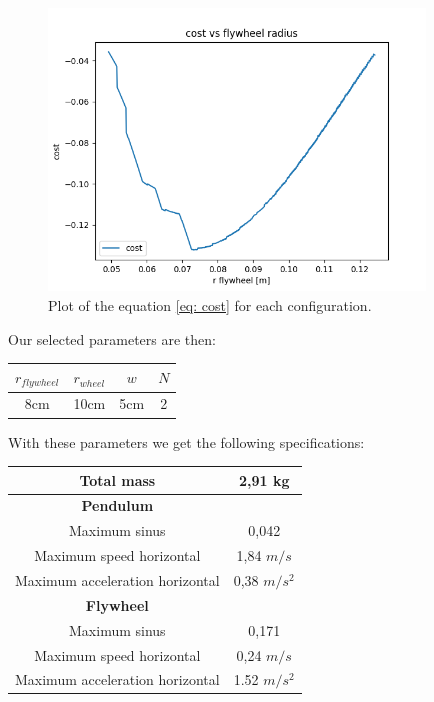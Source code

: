 \begin{figure}[H]
	\centering
	\includegraphics[width=10cm]{img/optimization/cost.png}
	\caption{Plot of the equation \ref{eq: cost} for each configuration.}
	\label{fig:Cost plot}
\end{figure}

Our selected parameters are then:
\begin{center}
	\begin{tabular}{ |c|c|c|c| } 
	 \hline
	 $r_{flywheel}$ & $r_{wheel}$ & $w$ & $N$\\
	 \hline 
	 8cm & 10cm & 5cm & 2 \\ 
	 \hline
	\end{tabular}
\end{center}

With these parameters we get the following specifications:
\begin{center}
	\begin{tabular}{ |c|c| } 
	 \hline
	 Total mass & 2,91 kg\\
	 \hline
	 \textbf{Pendulum} \\
	 \hline
	 Maximum sinus & 0,042\\
	 \hline
	 Maximum speed horizontal & 1,84 $m/s$\\
	 \hline
	 Maximum acceleration horizontal & 0,38 $m/s^2$\\
	 \hline
	 \textbf{Flywheel} \\
	 \hline
	 Maximum sinus & 0,171\\
	 \hline
	 Maximum speed horizontal & 0,24 $m/s$\\
	 \hline
	 Maximum acceleration horizontal & 1.52 $m/s^2$\\
	 \hline
	\end{tabular}
\end{center}